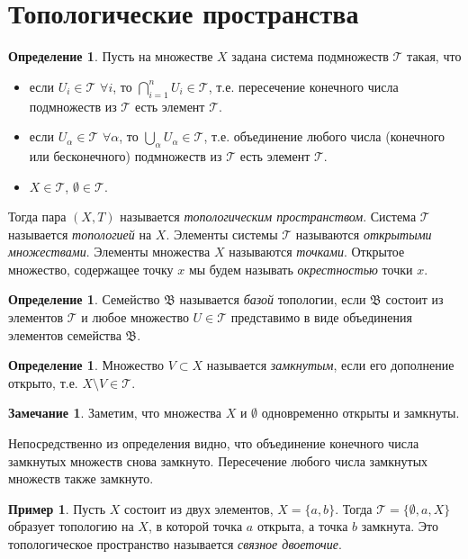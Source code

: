 \documentclass[12pt, titlepage, oneside]{amsbook}
\newcommand{\TTT}{{\mathcal T}}
\newcommand{\BBB}{\mathfrak{B}}
\theoremstyle{definition}
\newtheorem{example}[theorem]{Пример}
\newtheorem{definition}[theorem]{Определение}
\newtheorem{remark}[theorem]{Замечание}
\theoremstyle{remark}
\begin{document}
\section{Топологические пространства}

\begin{definition}
Пусть на множестве $X$ задана система подмножеств $\TTT$ такая, что
\begin{itemize}
\item если $U_i\in\TTT$ $\forall i$, то $\bigcap\limits_{i=1}^n U_i\in\TTT$, т.е. пересечение конечного числа подмножеств из $\TTT$ есть элемент $\TTT$.
\item если $U_\alpha\in\TTT$ $\forall \alpha$, то $\bigcup\limits_{\alpha} U_\alpha\in\TTT$, т.е. объединение любого числа (конечного или бесконечного) подмножеств из $\TTT$ есть элемент $\TTT$.
\item $X\in\TTT$, $\emptyset\in\TTT$.
\end{itemize}
Тогда пара $(X,T)$ называется \emph{топологическим пространством}. Система $\TTT$ называется \emph{топологией} на $X$. Элементы системы $\TTT$ называются \emph{открытыми множествами}. Элементы множества $X$ называются \emph{точками}. Открытое множество, содержащее точку $x$ мы будем называть \emph{окрестностью} точки $x$.
\end{definition}

\begin{definition}
Семейство $\BBB$ называется \emph{базой} топологии, если $\BBB$ состоит из элементов $\TTT$ и любое множество $U\in\TTT$ представимо в виде объединения элементов семейства $\BBB$.
\end{definition}

\begin{definition}
Множество $V\subset X$ называется \emph{замкнутым}, если его дополнение открыто, т.е. $X\setminus V\in\TTT$.
\end{definition}

\begin{remark}
Заметим, что множества $X$ и $\emptyset$ одновременно открыты и замкнуты.
\end{remark}

Непосредственно из определения видно, что объединение конечного числа замкнутых множеств снова замкнуто. Пересечение любого числа замкнутых множеств также замкнуто.

\begin{example}
Пусть $X$ состоит из двух элементов, $X=\{a,b\}$. Тогда $\TTT=\{\emptyset,a,X\}$ образует топологию на $X$, в которой точка $a$ открыта, а точка $b$ замкнута. Это топологическое пространство называется \emph{связное двоеточие}.
\end{example}
\end{document}
